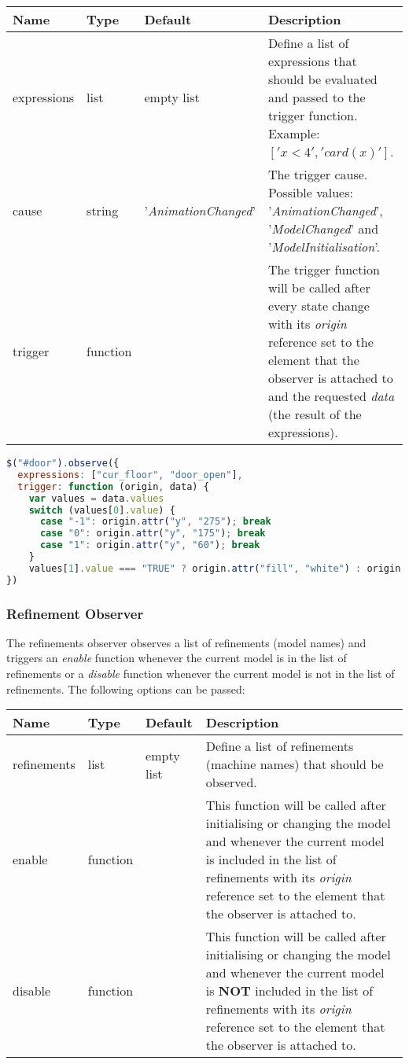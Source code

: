 \begin{tabular}{ l l l p{7cm} }
  \textbf{Name} & \textbf{Type} & \textbf{Default} & \textbf{Description} \\
  \hline\noalign{\medskip}
  expressions & list & empty list & Define a list of expressions that should be evaluated and passed to the trigger function. Example: $['x < 4', 'card(x)']$.\\
  \hline\noalign{\medskip}
  cause & string & '\textit{AnimationChanged}' & The trigger cause. Possible values: '\textit{AnimationChanged}', '\textit{ModelChanged}' and '\textit{ModelInitialisation}'. \\
  \hline\noalign{\medskip}
  trigger & function &  & The trigger function will be called after every state change with its \textit{origin} reference set to the element that the observer is attached to and the requested \textit{data} (the result of the expressions). \\
\end{tabular}

\begin{lstlisting}[float=ht,language=JavaScript]
$("#door").observe({
  expressions: ["cur_floor", "door_open"],
  trigger: function (origin, data) {
    var values = data.values
    switch (values[0].value) {
      case "-1": origin.attr("y", "275"); break
      case "0": origin.attr("y", "175"); break
      case "1": origin.attr("y", "60"); break
    }
    values[1].value === "TRUE" ? origin.attr("fill", "white") : origin.attr("fill", "lightgray")
})
\end{lstlisting}

\subsubsection{Refinement Observer}

The refinements observer observes a list of refinements (model names) and triggers an \textit{enable} function whenever the current model is in the list of refinements or a \textit{disable} function whenever the current model is not in the list of refinements.
The following options can be passed:

\begin{tabular}{ l l l p{7cm} }
  \textbf{Name} & \textbf{Type} & \textbf{Default} & \textbf{Description} \\
  \hline\noalign{\medskip}
  refinements & list & empty list & Define a list of refinements (machine names) that should be observed.\\
  \hline\noalign{\medskip}
  enable & function &  & This function will be called after initialising or changing the model and whenever the current model is included in the list of refinements with its \textit{origin} reference set to the element that the observer is attached to.\\
  \hline\noalign{\medskip}
  disable & function &  & This function will be called after initialising or changing the model and whenever the current model is \textbf{NOT} included in the list of refinements with its \textit{origin} reference set to the element that the observer is attached to.\\
\end{tabular}

